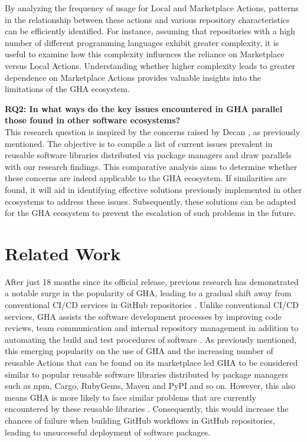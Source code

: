 \documentclass[conference]{IEEEtran}
\begin{document}
    By analyzing the frequency of usage for Local and Marketplace Actions, patterns in the relationship between these actions and various repository characteristics can be efficiently identified. For instance, assuming that repositories with a high number of different programming languages exhibit greater complexity, it is useful to examine how this complexity influences the reliance on Marketplace versus Local Actions. Understanding whether higher complexity leads to greater dependence on Marketplace Actions provides valuable insights into the limitations of the GHA ecosystem. 


 \textbf{RQ2: In what ways do the key issues encountered in GHA parallel those found in other software ecosystems?}\\

    This research question is inspired by the concerns raised by Decan \cite{decan2022use}, as previously mentioned. The objective is to compile a list of current issues prevalent in reusable software libraries distributed via package managers and draw parallels with our research findings. This comparative analysis aims to determine whether these concerns are indeed applicable to the GHA ecosystem. If similarities are found, it will aid in identifying effective solutions previously implemented in other ecosystems to address these issues. Subsequently, these solutions can be adapted for the GHA ecosystem to prevent the escalation of such problems in the future.




\section{Related Work}
 	After just 18 months since its official release, previous research has demonstrated a notable surge in the popularity of GHA, leading to a gradual shift away from conventional CI/CD services in GitHub repositories \cite{golzadeh2021rise}. Unlike conventional CI/CD services, GHA assists the software development processes by improving code reviews, team communication and internal repository management in addition to automating the build and test procedures of software \cite{chandrasekara2021hands}. As previously mentioned, this emerging popularity on the use of GHA and the increasing number of reusable Actions that can be found on its marketplace led GHA to be considered similar to popular reusable software libraries distributed by package managers such as npm, Cargo, RubyGems, Maven and PyPI and so on. However, this also means GHA is more likely to face similar problems that are currently encountered by these reusable libraries \cite{decan2022use}. Consequently, this would increase the chances of failure when building GitHub workflows in GitHub repositories, leading to unsuccessful deployment of software packages.
\end{document}
